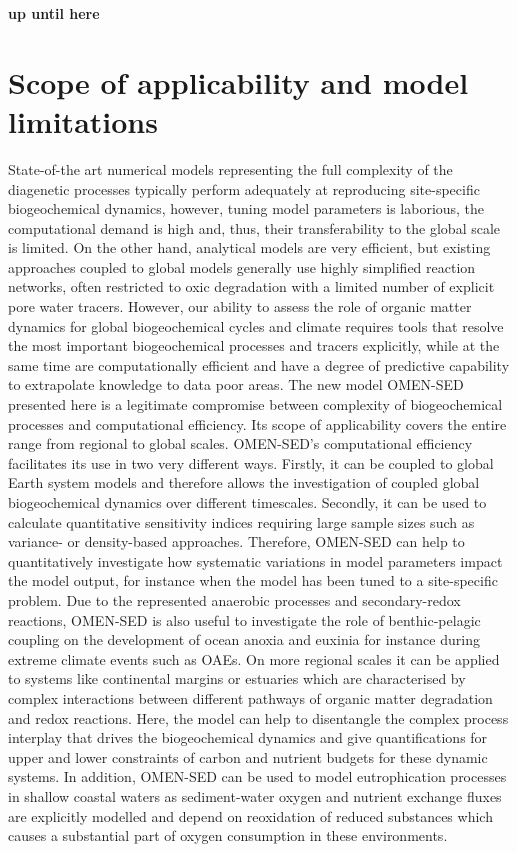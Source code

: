 \documentclass[gmd, manuscript]{copernicus}
\begin{document}
\textbf{up until here}

\section{Scope of applicability and model limitations}
State-of-the art numerical models representing the full complexity of the diagenetic processes typically perform adequately at reproducing site-specific biogeochemical dynamics, however, tuning model parameters is laborious, 
the computational demand is high and, thus, their transferability to the global scale is limited. On the other hand, analytical models are very efficient, but existing approaches coupled to global models generally use highly 
simplified reaction networks, often restricted to oxic degradation with a limited number of explicit pore water tracers. However, our ability to assess the role of organic matter dynamics for global biogeochemical cycles and climate 
requires tools that resolve the most important biogeochemical processes and tracers explicitly, while at the same time are computationally efficient and have a degree of predictive capability to extrapolate knowledge to data poor areas. 
The new model OMEN-SED presented here is a legitimate compromise between complexity of biogeochemical processes and computational efficiency. 
Its scope of applicability covers the entire range from regional to global scales. 
OMEN-SED's computational efficiency facilitates its use in two very different ways. Firstly, it can be coupled to global Earth system models and therefore allows the investigation of coupled global biogeochemical dynamics over different timescales. 
Secondly, it can be used to calculate quantitative sensitivity indices requiring large sample sizes such as variance- or density-based approaches. Therefore, OMEN-SED can help to quantitatively investigate how systematic variations in model parameters 
impact the model output, for instance when the model has been tuned to a site-specific problem. 
Due to the represented anaerobic processes and secondary-redox reactions, OMEN-SED is also useful to investigate the role of benthic-pelagic coupling on the development of ocean anoxia and euxinia for instance during extreme climate 
events such as OAEs. On more regional scales it can be applied to systems like continental margins or estuaries which are characterised by complex interactions between different pathways of organic matter degradation and redox reactions. 
Here, the model can help to disentangle the complex process interplay that drives the biogeochemical dynamics and give quantifications for upper and lower constraints of carbon and nutrient budgets for these dynamic systems. 
In addition, OMEN-SED can be used to model eutrophication processes in shallow coastal waters as sediment-water oxygen and nutrient exchange fluxes are explicitly modelled and depend on reoxidation of reduced substances which causes a substantial 
part of oxygen consumption in these environments. %
\end{document}

